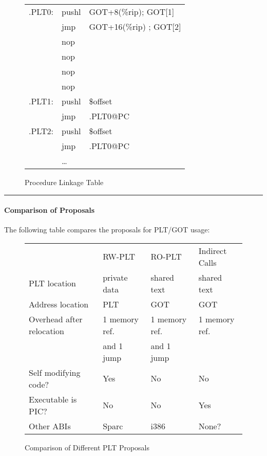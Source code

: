 \begin{figure}[H]
\caption{Procedure Linkage Table}
\begin{tabular}{lll}
.PLT0: & pushl & GOT+8(\%rip); GOT[1]\\
& jmp &GOT+16(\%rip) ; GOT[2] \\
& nop & \\
& nop & \\
& nop & \\
& nop & \\
.PLT1: & pushl & \$offset \\
&jmp &.PLT0@PC \\
.PLT2: &pushl & \$offset \\
& jmp & .PLT0@PC \\
&\dots\\
\end{tabular}
\end{figure}



\bigskip\hrule

\paragraph{Comparison of Proposals}

The following table compares the proposals for PLT/GOT usage:

\begin{figure}[H]
\caption{Comparison of Different PLT Proposals}

\begin{center}
\begin{tabular}{llll}
    \hline\noalign{\smallskip}
&RW-PLT & RO-PLT & Indirect Calls \\
    \noalign{\smallskip}\hline\noalign{\smallskip}
PLT location & private data & shared text & shared text \\
Address location & PLT & GOT & GOT \\
Overhead after relocation & 1 memory ref. & 1 memory ref. & 1 memory ref.\\
&and 1 jump &and 1 jump &  \\
Self modifying code? & Yes &  No & No\\
Executable is PIC? & No & No & Yes \\
Other ABIs & Sparc & i386 & None? \\
\end{tabular}
\end{center}
\end{figure}
                                


